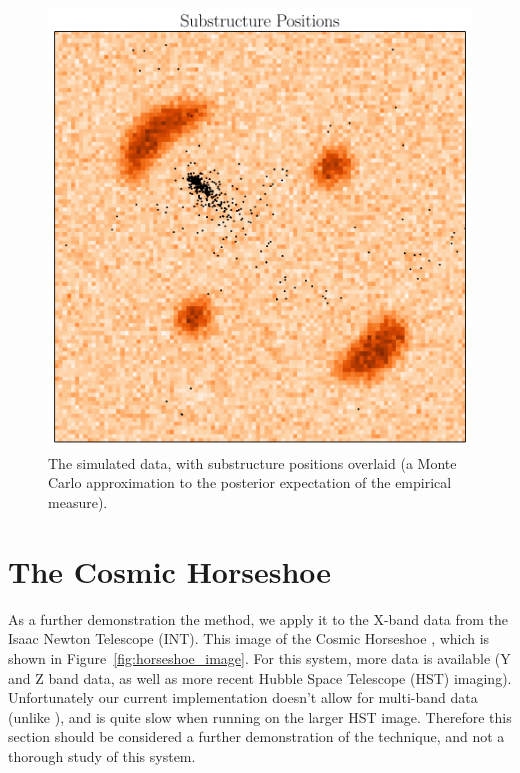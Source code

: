 \documentclass[useAMS,usenatbib]{mn2e}
\begin{document}
\begin{figure}
\begin{center}
\includegraphics[scale=0.4]{substructures.pdf}
\caption{The simulated data, with substructure positions overlaid (a
Monte Carlo approximation to the posterior expectation of the empirical
measure).
\label{fig:substructures}}
\end{center}
\end{figure}



\section{The Cosmic Horseshoe}
As a further demonstration the method, we apply it to the X-band data
from the Isaac Newton Telescope (INT). This image of the Cosmic Horseshoe
\citep{}, which is shown in Figure~\ref{fig:horseshoe_image}. For this system,
more data is available (Y and Z band data, as well as more recent
Hubble Space Telescope (HST) imaging). Unfortunately our current implementation
doesn't allow for multi-band data (unlike \citet{2011MNRAS.412.2521B}), and
is quite slow when running on the larger HST image. Therefore this section
should be considered a further demonstration of the technique, and not a
thorough study of this system.
\end{document}
